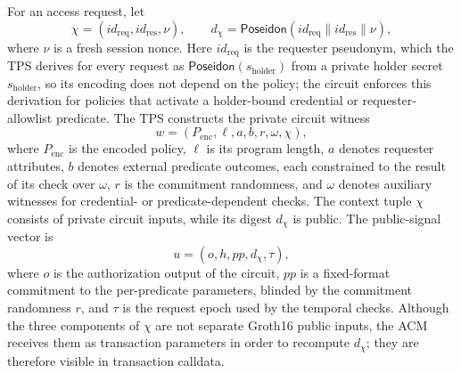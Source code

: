 For an access request, let
\begin{equation}
	\chi=(\mathit{id}_{\mathrm{req}},\mathit{id}_{\mathrm{res}},\nu),
	\qquad
	d_{\chi}=\mathsf{Poseidon}(\mathit{id}_{\mathrm{req}}\parallel
	\mathit{id}_{\mathrm{res}}\parallel\nu),
\end{equation}
where $\nu$ is a fresh session nonce.
Here $\mathit{id}_{\mathrm{req}}$ is the requester pseudonym, which the TPS derives for every request as $\mathsf{Poseidon}(s_{\mathrm{holder}})$ from a private holder secret $s_{\mathrm{holder}}$, so its encoding does not depend on the policy; the circuit enforces this derivation for policies that activate a holder-bound credential or requester-allowlist predicate.
The TPS constructs the private circuit witness
\begin{equation}
	w = (P_{\mathrm{enc}}, \ell, a, b, r, \omega, \chi),
\end{equation}
where $P_{\mathrm{enc}}$ is the encoded policy, $\ell$ is its program length, $a$ denotes requester attributes, $b$ denotes external predicate outcomes, each constrained to the result of its check over $\omega$, $r$ is the commitment randomness, and $\omega$ denotes auxiliary witnesses for credential- or predicate-dependent checks.
The context tuple $\chi$ consists of private circuit inputs, while its digest $d_{\chi}$ is public.
The public-signal vector is
\begin{equation}
	u = (o,h,\mathit{pp},d_{\chi},\tau),
\end{equation}
where $o$ is the authorization output of the circuit, $\mathit{pp}$ is a fixed-format commitment to the per-predicate parameters, blinded by the commitment randomness $r$, and $\tau$ is the request epoch used by the temporal checks.
Although the three components of $\chi$ are not separate Groth16 public inputs, the ACM receives them as transaction parameters in order to recompute $d_{\chi}$; they are therefore visible in transaction calldata.


